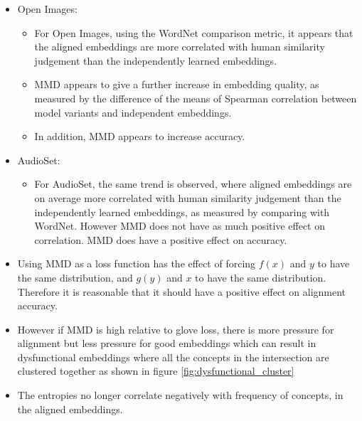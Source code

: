 \begin{itemize}
    \item Open Images:
    \begin{itemize}
        \item For Open Images, using the WordNet comparison metric, it appears that the aligned embeddings are more correlated with human similarity judgement than the independently learned embeddings. 
        \item MMD appears to give a further increase in embedding quality, as measured by the difference of the means of Spearman correlation between model variants and independent embeddings.
        \item In addition, MMD appears to increase accuracy. 
    \end{itemize}
    \item AudioSet:
    \begin{itemize}
        \item For AudioSet, the same trend is observed, where aligned embeddings are on average more correlated with human similarity judgement than the independently learned embeddings, as measured by comparing with WordNet. However MMD does not have as much positive effect on correlation. MMD does have a positive effect on accuracy.  
    \end{itemize}
    \item Using MMD as a loss function has the effect of forcing $f(x)$ and $y$ to have the same distribution, and  $g(y)$ and $x$ to have the same distribution. Therefore it is reasonable that it should have a positive effect on alignment accuracy. 
    \item However if MMD is high relative to glove loss, there is more pressure for alignment but less pressure for good embeddings which can result in dysfunctional embeddings where all the concepts in the intersection are clustered together as shown in figure \ref{fig:dysfunctional_cluster}
    \item The entropies no longer correlate negatively with frequency of concepts, in the aligned embeddings. 
\end{itemize}
